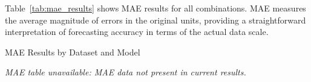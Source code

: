 \documentclass{article}
\begin{document}
\begin{appendices}
Table~\ref{tab:mae_results} shows MAE results for all combinations. MAE measures the average magnitude of errors in the original units, providing a straightforward interpretation of forecasting accuracy in terms of the actual data scale.

\begin{table}[htbp]
\centering
\caption{MAE Results by Dataset and Model}
\label{tab:mae_results}
% 
\textit{MAE table unavailable: MAE data not present in current results.}
\vspace{0.1cm}

\end{table}








\end{appendices}
\end{document}
